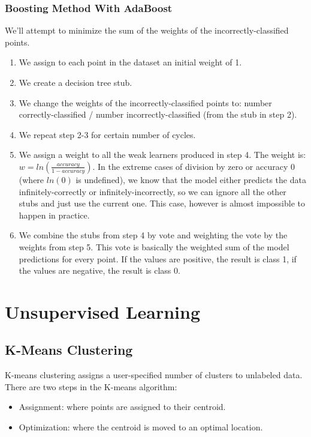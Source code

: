 \documentclass{article}
\begin{document}
\subsubsection{Boosting Method With AdaBoost}
We’ll attempt to minimize the sum of the weights of the incorrectly-classified points.

\begin{enumerate}
  \item We assign to each point in the dataset an initial weight of 1.
  \item We create a decision tree stub.
  \item We change the weights of the incorrectly-classified points to: number correctly-classified / number incorrectly-classified (from the stub in step 2).
  \item We repeat step 2-3 for certain number of cycles.
  \item We assign a weight to all the weak learners produced in step 4. The weight is: $w = ln \left( \frac{accuracy}{1 - accuracy} \right)$. In the extreme cases of division by zero or accuracy 0 (where $ln(0)$ is undefined), we know that the model either predicts the data infinitely-correctly or infinitely-incorrectly, so we can ignore all the other stubs and just use the current one. This case, however is almost impossible to happen in practice.
  \item We combine the stubs from step 4 by vote and weighting the vote by the weights from step 5. This vote is basically the weighted sum of the model predictions for every point. If the values are positive, the result is class 1, if the values are negative, the result is class 0.
\end{enumerate}

\section{Unsupervised Learning}
\subsection{K-Means Clustering}
K-means clustering assigns a user-specified number of clusters to unlabeled data. There are two steps in the K-means algorithm:

\begin{itemize}
  \item Assignment: where points are assigned to their centroid.
  \item Optimization: where the centroid is moved to an optimal location.
\end{itemize}
\end{document}
